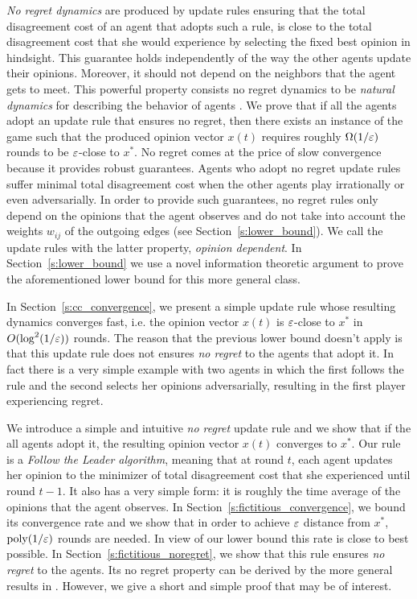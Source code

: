 \emph{No regret dynamics} are produced by update rules
ensuring that the total disagreement cost of an agent that adopts such a
rule, is close to the total disagreement cost that she would experience by
selecting the fixed best opinion in hindsight. This guarantee holds
independently of the way the other agents update their opinions.
Moreover, it should not depend on the neighbors that the agent gets to meet.
This powerful property consists no regret dynamics to be \emph{natural dynamics}
for describing the behavior of agents \cite{EMN09}.
We prove that if all the agents adopt an update rule that ensures no regret,
then there exists an instance of the game such that the produced opinion
vector $x(t)$ requires roughly $\Omega(1/\varepsilon)$ rounds to
be $\varepsilon$-close to $x^*$. No regret comes at the price of slow convergence
because it provides robust guarantees.
Agents who adopt no regret update rules suffer minimal total disagreement
cost when the other agents play irrationally or even adversarially.
In order to provide such guarantees, no regret rules only depend on
the opinions that the agent observes and do not take into account
the weights $w_{ij}$ of the outgoing edges (see Section~\ref{s:lower_bound}).
We call the update rules with the latter property, \emph{opinion dependent}.
In Section~\ref{s:lower_bound} we use a novel information theoretic argument
to prove the aforementioned lower bound for this more general class.

In Section~\ref{s:cc_convergence}, we present a simple update rule
whose resulting dynamics converges fast, i.e.
the opinion vector $x(t)$ is $\varepsilon$-close to $x^*$ in
$O(\log^2 (1/\varepsilon))$ rounds. The reason that the previous lower
bound doesn't apply is that this update rule does not ensures \emph{no regret}
to the agents that adopt it. In fact there is a very
simple example with two agents in which the first follows the rule
and the second selects her opinions adversarially, resulting in
the first player experiencing regret.

We introduce a simple and intuitive \emph{no regret} update rule and we
show that if the all agents adopt it, the resulting opinion vector $x(t)$
converges to $x^*$.  Our rule is a \emph{Follow the Leader algorithm}, meaning
that at round $t$, each agent updates her opinion to the minimizer of total
disagreement cost that she experienced until round $t-1$.  It also has a very
simple form: it is roughly the time average of the opinions that the agent
observes.  In Section~\ref{s:fictitious_convergence}, we bound its convergence
rate and we show that in order to achieve $\varepsilon$ distance from $x^*$,
$\mathrm{poly}(1/\varepsilon)$ rounds are needed.  In view of our lower bound this rate
is close to best possible.  In Section~\ref{s:fictitious_noregret}, we show that this
rule ensures \emph{no regret} to the agents.  Its no regret property can be
derived by the more general results in \cite{HAK07}.  However, we give a short
and simple proof that may be of interest.

